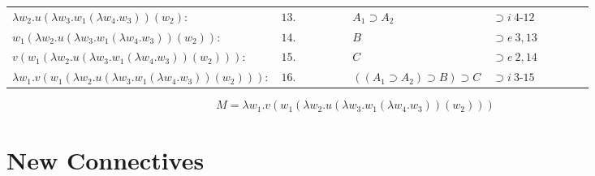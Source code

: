 \documentclass[11pt,a4paper]{article}
\begin{document}
\begin{itemize}
\begin{table}[H]
\begin{tabular}{*{12}{l}}
			\cline{4-11}
			
			$\lambda w_2 . u(\lambda w_3 . w_1(\lambda w_4 . w_3))(w_2):$ & $13.$ & \multicolumn{1}{|c}{} & & & & $A_1 \supset A_2$ & $\supset i \ 4$-$12$ & & & &\multicolumn{1}{c|}{}\\
			
			$w_1(\lambda w_2 . u(\lambda w_3 . w_1(\lambda w_4 . w_3))(w_2)):$ & $14.$ & \multicolumn{1}{|c}{} & & & & $B$ & $\supset e \ 3, 13$ & & & &\multicolumn{1}{c|}{}\\
			
			$v(w_1(\lambda w_2 . u(\lambda w_3 . w_1(\lambda w_4 . w_3))(w_2))):$ & $15.$ & \multicolumn{1}{|c}{} & & & & $C$ & $\supset e \ 2, 14$ & & & &\multicolumn{1}{c|}{}\\
			
			\cline{3-12}
			
			$\lambda w_1 . v(w_1(\lambda w_2 . u(\lambda w_3 . w_1(\lambda w_4 . w_3))(w_2))):$ & $16.$ & & & & & $((A_1 \supset A_2) \supset B) \supset C$ & $\supset i \ 3$-$15$ & & & &\\
		
		\end{tabular}
		\end{table}
		
		\[ \boxed{M = \lambda w_1 . v(w_1(\lambda w_2 . u(\lambda w_3 . w_1(\lambda w_4 . w_3))(w_2)))} \]
		

\end{itemize}


\section{New Connectives}
\end{document}
